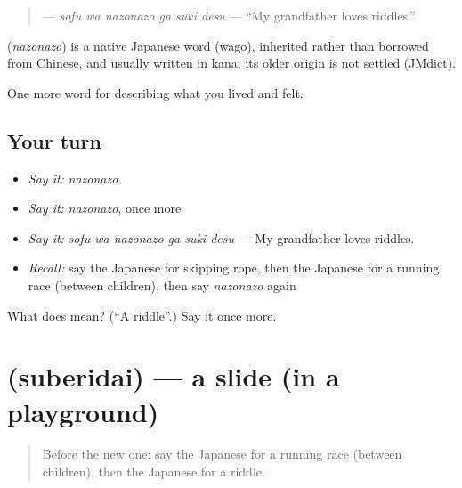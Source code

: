 \begin{quote}
\textbf{  } — \emph{sofu wa nazonazo ga suki desu} — \textquotedblleft{}My grandfather loves riddles.\textquotedblright{}
\end{quote}

\begin{cousinweb}
\textbf{} (\emph{nazonazo}) is a native Japanese word (wago), inherited rather than borrowed from Chinese, and usually written in kana; its older origin is not settled (JMdict).
\end{cousinweb}

\begin{grammarlens}[title={What you've built}]
One more word for describing what you lived and felt.
\end{grammarlens}

\subsection*{Your turn}
\begin{itemize}
\raggedright
  \item \emph{Say it:} \emph{nazonazo}
  \item \emph{Say it:} \emph{nazonazo}, once more
  \item \emph{Say it:} \emph{sofu wa nazonazo ga suki desu} — My grandfather loves riddles.
  \item \emph{Recall:} say the Japanese for skipping rope, then the Japanese for a running race (between children), then say \emph{nazonazo} again
\end{itemize}

\begin{tcolorbox}[breakable,colback=teal!4,colframe=teal!35!black,title={Before you move on}]
What does  mean? (\textquotedblleft{}A riddle\textquotedblright{}.) Say it once more.
\end{tcolorbox}
\section[\texorpdfstring{\ja{すべりだい} (suberidai)}{すべりだい (suberidai)}]{ (suberidai) — a slide (in a playground)}

\label{lesson:JA-C500-suberidai}



\begin{quote}
Before the new one: say the Japanese for a running race (between children), then the Japanese for a riddle.
\end{quote}

